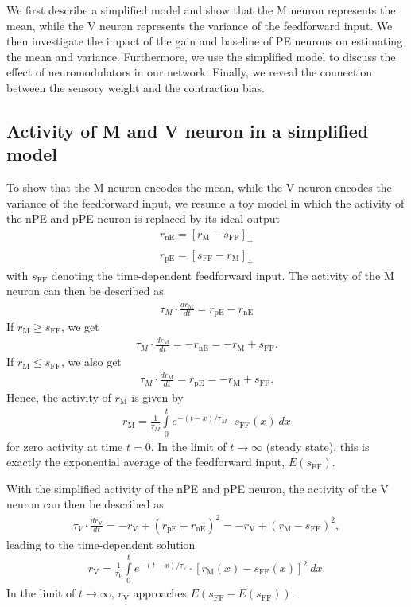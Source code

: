 \documentclass[10pt,a4paper,draft]{article}
\begin{document}
We first describe a simplified model and show that the M neuron represents the mean, while the V neuron represents the variance of the feedforward input. We then investigate the impact of the gain and baseline of PE neurons on estimating the mean and variance. Furthermore, we use the simplified model to discuss the effect of neuromodulators in our network. Finally, we reveal the connection between the sensory weight and the contraction bias.

\subsection{Activity of M and V neuron in a simplified model}\label{sec:toy}
%
To show that the M neuron encodes the mean, while the V neuron encodes the variance of the feedforward input, we resume a toy model in which the activity of the nPE and pPE neuron is replaced by its ideal output
%
\begin{align}
r_\mathrm{nE} = \left[ r_\mathrm{M} - s_\mathrm{FF}\right]_+ \nonumber \\
r_\mathrm{pE} = \left[ s_\mathrm{FF} - r_\mathrm{M} \right]_+
\end{align}
%
with $s_\mathrm{FF}$ denoting the time-dependent feedforward input. The activity of the M neuron can then be described as
%
\begin{align}
\tau_M \cdot \frac{dr_\mathrm{M}}{dt} = r_\mathrm{pE} - r_\mathrm{nE}
\end{align}
%
If $r_\mathrm{M} \geq s_\mathrm{FF}$, we get
%
\begin{align}
\tau_M \cdot \frac{dr_\mathrm{M}}{dt} = -r_\mathrm{nE} = -r_\mathrm{M} + s_\mathrm{FF}.
\end{align}
%
If $r_\mathrm{M} \leq s_\mathrm{FF}$, we also get
%
\begin{align}
\tau_M \cdot \frac{dr_\mathrm{M}}{dt} = r_\mathrm{pE} = -r_\mathrm{M} + s_\mathrm{FF}.\nonumber
\end{align}
%
Hence, the activity of $r_\mathrm{M}$ is given by
%
\begin{align}
r_\mathrm{M} = \frac{1}{\tau_M} \int\limits_0^t e^{-(t-x)/\tau_M}\cdot s_\mathrm{FF}(x)\ dx
\end{align}  
%
for zero activity at time $t=0$. In the limit of $t\rightarrow \infty$ (steady state), this is exactly the exponential average of the feedforward input, $E(s_\mathrm{FF})$.

With the simplified activity of the nPE and pPE neuron, the activity of the V neuron can then be described as
%
\begin{align}
\tau_V \cdot \frac{dr_\mathrm{V}}{dt} = -r_\mathrm{V} + (r_\mathrm{pE} +  r_\mathrm{nE})^2 = -r_\mathrm{V}  + (r_\mathrm{M} -  s_\mathrm{FF})^2,
\end{align}
%
leading to the time-dependent solution
%
\begin{align}
r_\mathrm{V} = \frac{1}{\tau_V} \int\limits_0^t e^{-(t-x)/\tau_V}\cdot \left[r_\mathrm{M}(x) -  s_\mathrm{FF}(x)\right]^2\ dx.
\end{align}  
%
In the limit of $t\rightarrow \infty$, $r_\mathrm{V}$ approaches $E(s_\mathrm{FF} - E(s_\mathrm{FF}))$.
\end{document}
